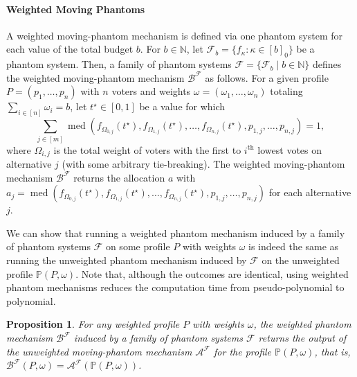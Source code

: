 \documentclass[11pt]{article}
\DeclareMathOperator*{\med}{med}
\newcommand{\F}{\mathcal{F}}
\newcommand{\A}{\mathcal{A}}
\newcommand{\B}{\mathcal{B}}
\newcommand{\N}{\mathbb{N}}
\newtheorem{proposition}{Proposition}
\begin{document}
\paragraph{Weighted Moving Phantoms} A weighted moving-phantom mechanism is defined via one phantom
system for each value of the total budget $b$. For $b \in \N$, let $\F_b = \{f_\kappa : \kappa \in [b]_0 \}$ be a phantom system. Then, a family of phantom systems $\F = \{\F_b \mid b \in \N\}$ defines the weighted moving-phantom mechanism $\B^\F$ as follows. For a given profile $P = (p_1, \dots, p_n)$ with $n$ voters and weights $\omega = (\omega_1, \dots, \omega_n)$ totaling $\sum_{i \in [n]} \omega_i = b$, let $t^\star \in [0,1]$ be a value for which
\[\sum_{j \in [m]} \med(f_{\Omega_{0,j}}(t^\star), f_{\Omega_{1,j}}(t^\star), \dots, f_{\Omega_{n,j}}(t^\star), p_{1,j}, \dots, p_{n,j}) = 1,\]
where $\Omega_{i,j}$ is the total weight of voters with the first to $i^{\textrm{th}}$ lowest votes on alternative $j$ (with some arbitrary tie-breaking). The weighted moving-phantom mechanism $\B^\F$ returns the allocation $a$ with $a_j = \med(f_{\Omega_{0,j}}(t^\star), f_{\Omega_{1,j}}(t^\star), \dots, f_{\Omega_{n,j}}(t^\star), p_{1,j}, \dots, p_{n,j})$ for each alternative $j$.

We can show that running a weighted phantom mechanism induced by a family of phantom systems $\F$ on some profile $P$ with weights $\omega$ is indeed the same as running the unweighted phantom mechanism induced by $\F$ on the unweighted profile $\mathbb{P}(P, \omega)$. Note that, although the outcomes are identical, using weighted phantom mechanisms reduces the computation time from pseudo-polynomial to polynomial.

\begin{proposition}
    For any weighted profile $P$ with weights $\omega$, the weighted phantom mechanism $\B^\F$ induced by a family of phantom systems $\F$ returns the output of the unweighted moving-phantom mechanism $\A^\F$ for the profile $\mathbb{P}(P, \omega)$, that is, $\B^\F(P, \omega) = \A^\F(\mathbb{P}(P, \omega))$.
\end{proposition}
\end{document}
